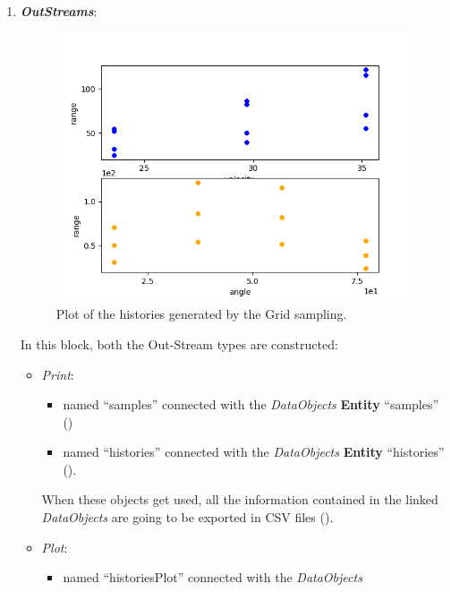 \begin{enumerate}
    \item \textbf{\textit{OutStreams}}:
 \begin{figure}[h!]
  \centering
  \includegraphics[scale=0.7]{../../tests/framework/user_guide/ForwardSamplingStrategies/gold/RunDir/Grid/1-historyPlot_scatter-scatter.png}
  \caption{Plot of the histories generated by the Grid sampling.}
  \label{fig:historiesGridPlotScatter}
 \end{figure}
  In this block, both the Out-Stream types are constructed:
  \begin{itemize}
    \item \textit{Print}:
     \begin{itemize}
       \item named ``samples'' connected with the \textit{DataObjects} \textbf{Entity} ``samples''
                ()
       \item named ``histories'' connected with the \textit{DataObjects} \textbf{Entity} ``histories'' ().
     \end{itemize}
      When these objects get used, all the information contained in the
      linked  \textit{DataObjects} are going
    to be exported in CSV files ().
    \item \textit{Plot}:
    \begin{itemize}
      \item named ``historiesPlot'' connected with the  \textit{DataObjects}

\end{itemize}
\end{itemize}
\end{enumerate}

